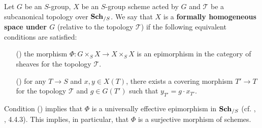 \begin{definition}
Let $G$ be an $S$-group, $X$ be an $S$-group scheme acted by $G$ and $\mathcal{T}$ be a subcanonical topology over $\mathbf{Sch}_{/S}$. We say that $X$ is a \textbf{formally homogeneous space under $G$} (relative to the topology $\mathcal{T}$) if the following equivalent conditions are satisfied:
\begin{enumerate}
    \item[(\rmnum{1})] the morphism $\Phi:G\times_SX\to X\times_SX$ is an epimorphism in the category of sheaves for the topology $\mathcal{T}$.
    \item[(\rmnum{2})] for any $T\to S$ and $x,y\in X(T)$, there exists a covering morphism $T'\to T$ for the topology $\mathcal{T}$ and $g\in G(T')$ such that $y_{T'}=g\cdot x_{T'}$.
\end{enumerate}
\end{definition}

\begin{remark}
Condition () implies that $\Phi$ is a universally effective epimorphism in $\mathbf{Sch}_{/S}$ (cf. \cite{SGA3-1}, , 4.4.3). This implies, in particular, that $\Phi$ is a surjective morphism of schemes.
\end{remark}

